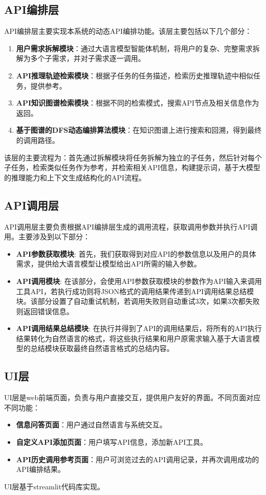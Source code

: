 \subsection{API编排层}
API编排层主要实现本系统的动态API编排功能。该层主要包括以下几个部分：
\begin{enumerate}
    \item \textbf{用户需求拆解模块}：通过大语言模型智能体机制，将用户的复杂、完整需求拆解为多个子需求，并对子需求逐一调用。
    \item \textbf{API推理轨迹检索模块}：根据子任务的任务描述，检索历史推理轨迹中相似任务，提供参考。
    \item \textbf{API知识图谱检索模块}：根据不同的检索模式，搜索API节点及相关信息作为返回。
    \item \textbf{基于图谱的DFS动态编排算法模块}：在知识图谱上进行搜索和回溯，得到最终的调用路径。
\end{enumerate}
该层的主要流程为：首先通过拆解模块将任务拆解为独立的子任务，然后针对每个子任务，检索类似任务作为参考，并检索相关API信息，构建提示词，基于大模型的推理能力和上下文生成结构化的API流程。

\subsection{API调用层}
API调用层主要负责根据API编排层生成的调用流程，获取调用参数并执行API调用。主要涉及到以下部分：
\begin{itemize}
    \item \textbf{API参数获取模块}: 首先，我们获取得到对应API的参数信息以及用户的具体需求，提供给大语言模型让模型给出API所需的输入参数。
    \item \textbf{API调用模块}: 在该部分，会使用API参数获取模块的参数作为API输入来调用工具API，若执行成功则将JSON格式的调用结果传递到API调用结果总结模块。该部分设置了自动重试机制，若调用失败则自动重试3次，如果3次都失败则返回错误信息。
    \item \textbf{API调用结果总结模块}: 在执行并得到了API的调用结果后，将所有的API执行结果转化为自然语言的格式，将这些执行结果和用户原需求输入基于大语言模型的总结模块获取最终自然语言格式的总结内容。
\end{itemize}

\subsection{UI层}
UI层是web前端页面，负责与用户直接交互，提供用户友好的界面。不同页面对应不同功能：
\begin{itemize}
    \item \textbf{信息问答页面}：用户通过自然语言与系统交互。
    \item \textbf{自定义API添加页面}：用户填写API信息，添加新API工具。
    \item \textbf{API历史调用参考页面}：用户可浏览过去的API调用记录，并再次调用成功的API编排结果。
\end{itemize}
UI层基于streamlit代码库实现。

